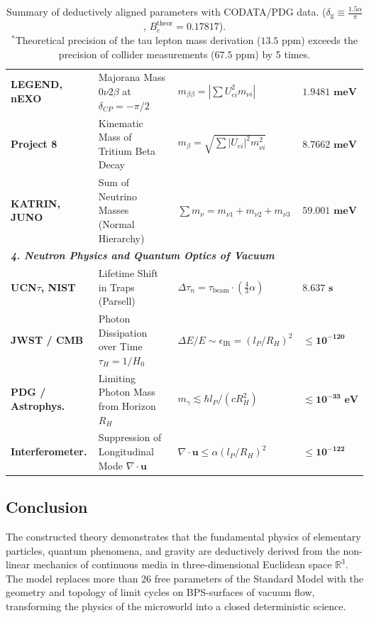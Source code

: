 \documentclass[12pt,a4paper]{article}
\begin{document}
\begin{table}[H]
\begin{tabularx}{\textwidth}{p{2.8cm} p{4.6cm} p{4.6cm} >{\raggedleft\arraybackslash}X}
\textbf{LEGEND, nEXO} & Majorana Mass $0\nu 2\beta$ at $\delta_{CP}=-\pi/2$ & $m_{\beta\beta} = |\sum U_{ei}^2 m_{\nu i}|$ & $\mathbf{1.9481 \text{ meV}}$ \\
\textbf{Project 8} & Kinematic Mass of Tritium Beta Decay & $m_\beta = \sqrt{\sum |U_{ei}|^2 m_{\nu i}^2}$ & $\mathbf{8.7662 \text{ meV}}$ \\
\textbf{KATRIN, JUNO} & Sum of Neutrino Masses (Normal Hierarchy) & $\sum m_\nu = m_{\nu 1} + m_{\nu 2} + m_{\nu 3}$ & $\mathbf{59.001 \text{ meV}}$ \\
\midrule
\multicolumn{4}{l}{\textit{\textbf{4. Neutron Physics and Quantum Optics of Vacuum}}} \\
\textbf{UCN$\tau$, NIST} & Lifetime Shift in Traps (Parsell) & $\Delta \tau_n = \tau_{\text{beam}} \cdot (\frac{4}{3}\alpha)$ & $\mathbf{8.637 \text{ s}}$ \\
\textbf{JWST / CMB} & Photon Dissipation over Time $\tau_H = 1/H_0$ & $\Delta E / E \sim \epsilon_{\text{IR}} = (l_P / R_H)^2$ & $\mathbf{\le 10^{-120}}$ \\
\textbf{PDG / Astrophys.} & Limiting Photon Mass from Horizon $R_H$ & $m_\gamma \lesssim \hbar l_P / (c R_H^2)$ & $\mathbf{\lesssim 10^{-33} \text{ eV}}$ \\
\textbf{Interferometer.} & Suppression of Longitudinal Mode $\nabla\cdot\mathbf{u}$ & $\nabla\cdot\mathbf{u} \le \alpha (l_P / R_H)^2$ & $\mathbf{\le 10^{-122}}$ \\
\bottomrule
\end{tabularx}
\caption{Summary of deductively aligned parameters with CODATA/PDG data. ($\delta_{\text{g}} \equiv \frac{1.5\alpha}{\pi}$, $B_e^{\text{theor}} = 0.17817$).\\
$^*$Theoretical precision of the tau lepton mass derivation ($13.5$ ppm) exceeds the precision of collider measurements ($67.5$ ppm) by 5 times.}
\label{tab:final_summary}
\end{table}
																		
\subsection{Conclusion}
The constructed theory demonstrates that the fundamental physics of elementary particles, quantum phenomena, and gravity are deductively derived from the non-linear mechanics of continuous media in three-dimensional Euclidean space $\mathbb{R}^3$. The model replaces more than 26 free parameters of the Standard Model with the geometry and topology of limit cycles on BPS-surfaces of vacuum flow, transforming the physics of the microworld into a closed deterministic science.
																		
\end{document}
